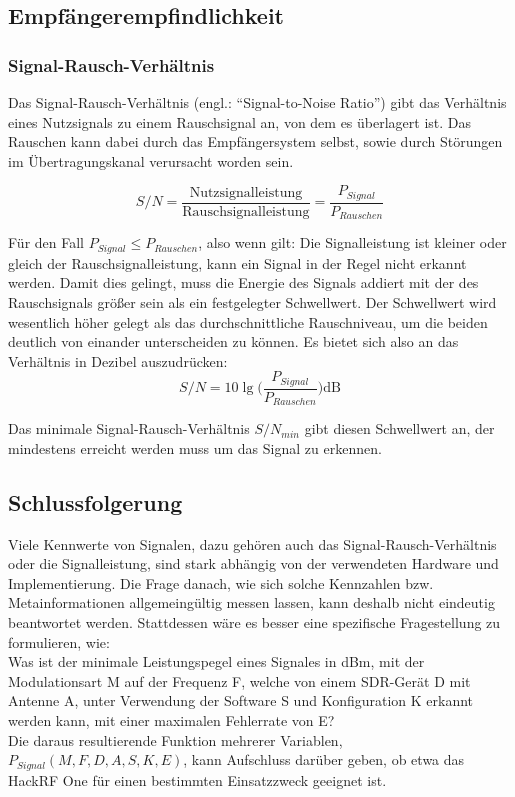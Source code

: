 \subsection{Empfängerempfindlichkeit}
\subsubsection{Signal-Rausch-Verhältnis}
Das Signal-Rausch-Verhältnis (engl.: \enquote{Signal-to-Noise Ratio}) gibt das Verhältnis eines Nutzsignals 
zu einem Rauschsignal an, von dem es überlagert ist. Das Rauschen kann dabei durch das Empfängersystem selbst, 
sowie durch Störungen im Übertragungskanal verursacht worden sein. %

\[ S/N = \frac{\text{Nutzsignalleistung}}{\text{Rauschsignalleistung}} = \frac{P_{Signal}}{P_{Rauschen}} \]


Für den Fall \(P_{Signal} \leq P_{Rauschen}\), also wenn gilt: 
Die Signalleistung ist kleiner oder gleich der Rauschsignalleistung, kann ein Signal in der Regel nicht erkannt werden.
Damit dies gelingt, muss die Energie des Signals addiert mit der des Rauschsignals größer sein als ein festgelegter Schwellwert.
Der Schwellwert wird wesentlich höher gelegt als das durchschnittliche Rauschniveau, um die beiden deutlich von einander unterscheiden zu können.
Es bietet sich also an das Verhältnis in Dezibel auszudrücken:
\[ S/N = 10 \lg \Big( \frac{P_{Signal}}{P_{Rauschen}} \Big) \text{dB}\] 



Das minimale Signal-Rausch-Verhältnis \(S/N_{min}\) gibt diesen Schwellwert an, der mindestens erreicht werden muss um das Signal zu erkennen. 

\subsection{Schlussfolgerung}
Viele Kennwerte von Signalen, dazu gehören auch das Signal-Rausch-Verhältnis oder die Signalleistung, sind stark abhängig von der verwendeten Hardware und Implementierung.
Die Frage danach, wie sich solche Kennzahlen bzw. Metainformationen allgemeingültig messen lassen, kann deshalb nicht eindeutig beantwortet werden.
Stattdessen wäre es besser eine spezifische Fragestellung zu formulieren, wie: \\
Was ist der minimale Leistungspegel eines Signales in dBm, mit der Modulationsart M auf der Frequenz F, welche von einem SDR-Gerät D mit Antenne A, unter Verwendung der Software S und Konfiguration K erkannt werden kann, mit einer maximalen Fehlerrate von E?\\
Die daraus resultierende Funktion mehrerer Variablen, \(P_{Signal} (M, F, D, A, S, K, E)\), kann Aufschluss darüber geben, ob etwa das HackRF One für einen bestimmten Einsatzzweck geeignet ist.

